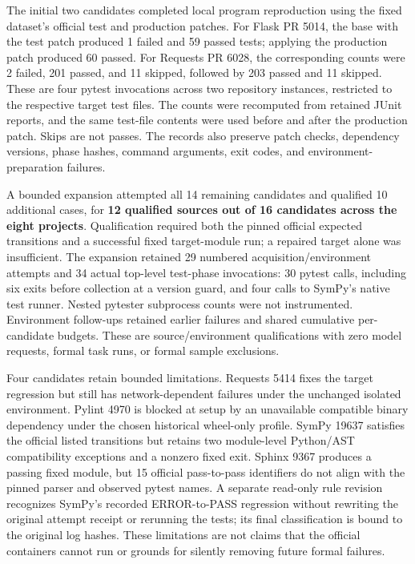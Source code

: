 \documentclass[
  11pt,
  a4paper,
]{article}
\begin{document}
The initial two candidates completed local program reproduction using
the fixed dataset's official test and production patches. For Flask PR
5014, the base with the test patch produced 1 failed and 59 passed
tests; applying the production patch produced 60 passed. For Requests PR
6028, the corresponding counts were 2 failed, 201 passed, and 11
skipped, followed by 203 passed and 11 skipped. These are four pytest
invocations across two repository instances, restricted to the
respective target test files. The counts were recomputed from retained
JUnit reports, and the same test-file contents were used before and
after the production patch. Skips are not passes. The records also
preserve patch checks, dependency versions, phase hashes, command
arguments, exit codes, and environment-preparation failures.

A bounded expansion attempted all 14 remaining candidates and qualified
10 additional cases, for \textbf{12 qualified sources out of 16
candidates across the eight projects}. Qualification required both the
pinned official expected transitions and a successful fixed
target-module run; a repaired target alone was insufficient. The
expansion retained 29 numbered acquisition/environment attempts and 34
actual top-level test-phase invocations: 30 pytest calls, including six
exits before collection at a version guard, and four calls to SymPy's
native test runner. Nested pytester subprocess counts were not
instrumented. Environment follow-ups retained earlier failures and
shared cumulative per-candidate budgets. These are source/environment
qualifications with zero model requests, formal task runs, or formal
sample exclusions.

Four candidates retain bounded limitations. Requests 5414 fixes the
target regression but still has network-dependent failures under the
unchanged isolated environment. Pylint 4970 is blocked at setup by an
unavailable compatible binary dependency under the chosen historical
wheel-only profile. SymPy 19637 satisfies the official listed
transitions but retains two module-level Python/AST compatibility
exceptions and a nonzero fixed exit. Sphinx 9367 produces a passing
fixed module, but 15 official pass-to-pass identifiers do not align with
the pinned parser and observed pytest names. A separate read-only rule
revision recognizes SymPy's recorded ERROR-to-PASS regression without
rewriting the original attempt receipt or rerunning the tests; its final
classification is bound to the original log hashes. These limitations
are not claims that the official containers cannot run or grounds for
silently removing future formal failures.
\end{document}
